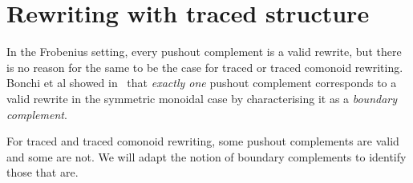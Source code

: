 \section{Rewriting with traced structure}

In the Frobenius setting, every pushout complement is a valid rewrite, but there
is no reason for the same to be the case for traced or traced comonoid
rewriting.
Bonchi et al showed in~\cite{bonchi2022stringa} that \emph{exactly one} pushout
complement corresponds to a valid rewrite in the symmetric monoidal case by
characterising it as a \emph{boundary complement}.

For traced and traced comonoid rewriting, some pushout complements are valid and
some are not.
We will adapt the notion of boundary complements to identify those that are.